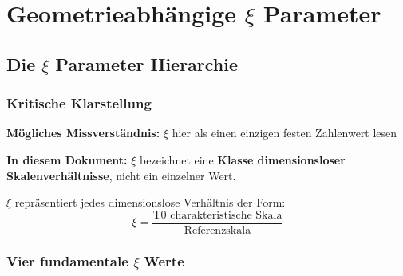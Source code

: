 	\section{Geometrieabhängige $\xi$ Parameter}
	\label{sec:geometrieabhaengige_xi}
	
	\subsection{Die $\xi$ Parameter Hierarchie}
	\label{subsec:xi_hierarchie}
	
	\subsubsection{Kritische Klarstellung}
	\label{subsubsec:kritische_klarstellung}
	
	\begin{tcolorbox}[colback=red!10!white,colframe=red!75!black,title=Klarstellung: Verwendung des Symbols $\xi$ in diesem Dokument]
		\textbf{Mögliches Missverständnis:} $\xi$ hier als einen einzigen festen Zahlenwert lesen
		
		\textbf{In diesem Dokument:} $\xi$ bezeichnet eine \textbf{Klasse dimensionsloser Skalenverhältnisse}, nicht ein einzelner Wert.
		
		$\xi$ repräsentiert jedes dimensionslose Verhältnis der Form:
		\begin{equation}
			\xi = \frac{\text{T0 charakteristische Skala}}{\text{Referenzskala}}
		\end{equation}
	\end{tcolorbox}
	
	\subsubsection{Vier fundamentale $\xi$ Werte}
	\label{subsubsec:vier_fundamentale_werte}
	
	\begin{table}[htbp]
		\centering
		\caption{Die vier fundamentalen $\xi$ Parameterwerte}
		\label{tab:vier_xi_werte}
	\end{table}
	
